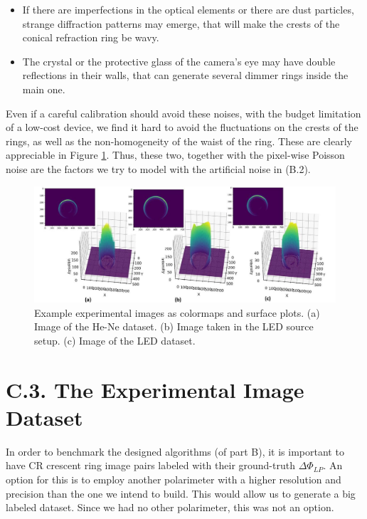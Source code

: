 \documentclass[11pt, a4paper, twoside]{article} %
\begin{document}
\begin{itemize}
\item If there are imperfections in the optical elements or there are dust particles, strange diffraction patterns may emerge, that will make the crests of the conical refraction ring be wavy. 
\item The crystal or the protective glass of the camera's eye may have double reflections in their walls, that can generate several dimmer rings inside the main one.\vspace{-0.2cm}
\end{itemize}
Even if a careful calibration should avoid these noises, with the budget limitation of a low-cost device, we find it hard to avoid the fluctuations on the crests of the rings, as well as the non-homogeneity of the waist of the ring. These are clearly appreciable in Figure \ref{fig:expnoise}. Thus, these two, together with the pixel-wise
Poisson noise are the factors we try to model with the artificial noise in (B.2).\vspace{0.1cm}
\begin{figure}[h!] 
     \centering 
    \includegraphics[width=\linewidth]{exp.jpg}
\caption{Example experimental images as colormaps and surface plots. (a) Image of the He-Ne dataset. (b) Image taken in the LED source setup. (c) Image of the LED dataset. }
        \label{fig:expnoise}
\end{figure}
\vspace{-0.6cm}
\section*{C.3. The Experimental Image Dataset\vspace{-0.1cm}}
In order to benchmark the designed algorithms (of part B), it is important to have CR crescent ring image pairs labeled with their ground-truth $\Delta \Phi_{LP}$. An option for this is to employ another polarimeter with a higher resolution and precision than the one we intend to build. This would allow us to generate a big labeled dataset. Since we had no other polarimeter, this was not an option.
\end{document}
